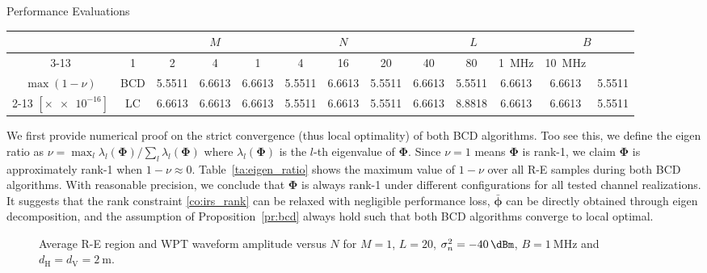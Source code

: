 \documentclass[journal]{IEEEtran}
\begin{document}
\begin{section}{Performance Evaluations}
		\begin{table*}[!t]
			\caption{The maximum value of $1-\nu$ over all R-E samples during BCD and LC-BCD algorithms for all tested channel realizations}
			\label{ta:eigen_ratio}
			\centering
			\begin{tabular}{|c|c|c|c|c|c|c|c|c|c|c|c|c|}
			\hline
			\multicolumn{2}{|c|}{\multirow{2}{*}{}} & \multicolumn{3}{c|}{$M$} & \multicolumn{3}{c|}{$N$} & \multicolumn{3}{c|}{$L$} & \multicolumn{2}{c|}{$B$} \\ \cline{3-13}
			\multicolumn{2}{|c|}{} & \num{1} & \num{2} & \num{4} & \num{1} & \num{4} & \num{16} & \num{20} & \num{40} & \num{80} & \SI{1}{\MHz} & \SI{10}{\MHz} \\ \hline
			$\max(1 - \nu)$ & BCD & \num{5.5511} & \num{6.6613} & \num{6.6613} & \num{5.5511} & \num{6.6613} & \num{5.5511} & \num{6.6613} & \num{5.5511} & \num{6.6613} & \num{6.6613} & \num{5.5511} \\ \cline{2-13}
			$[\times \num{e-16}]$ & LC & \num{6.6613} & \num{6.6613} & \num{6.6613} & \num{5.5511} & \num{6.6613} & \num{5.5511} & \num{6.6613} & \num{8.8818} & \num{6.6613} & \num{6.6613} & \num{5.5511} \\ \hline
			\end{tabular}
		\end{table*}

		We first provide numerical proof on the strict convergence (thus local optimality) of both BCD algorithms. Too see this, we define the eigen ratio as $\nu=\max_l\lambda_l(\boldsymbol{\Phi})/\sum_l\lambda_l(\boldsymbol{\Phi})$ where $\lambda_l(\boldsymbol{\Phi})$ is the $l$-th eigenvalue of $\boldsymbol{\Phi}$. Since $\nu=1$ means $\boldsymbol{\Phi}$ is rank-\num{1}, we claim $\boldsymbol{\Phi}$ is approximately rank-\num{1} when $1-\nu \approx 0$. Table~\ref{ta:eigen_ratio} shows the maximum value of $1-\nu$ over all R-E samples during both BCD algorithms. With reasonable precision, we conclude that $\boldsymbol{\Phi}$ is always rank-\num{1} under different configurations for all tested channel realizations. It suggests that the rank constraint \ref{co:irs_rank} can be relaxed with negligible performance loss, $\bar{\boldsymbol{\phi}}$ can be directly obtained through eigen decomposition, and the assumption of Proposition~\ref{pr:bcd} always hold such that both BCD algorithms converge to local optimal.

		\begin{figure}[!t]
			\centering
			\caption{Average R-E region and WPT waveform amplitude versus $N$ for $M=1$, $L=20$, $\sigma_n^2=\SI{-40}{\dBm}$, $B=\SI{1}{\MHz}$ and $d_{\mathrm{H}}=d_{\mathrm{V}}=\SI{2}{\meter}$.}
		\end{figure}


\end{section}
\end{document}
